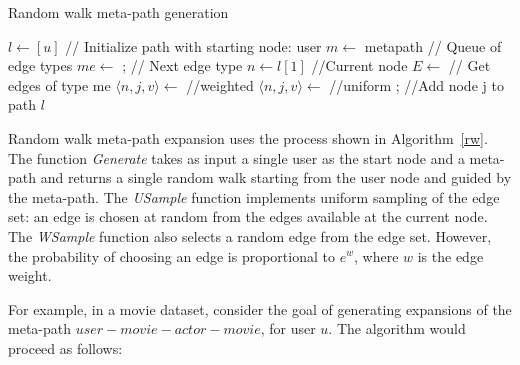\documentclass {acmart}
\begin{document}
	\begin{algorithm}
		\caption{Random walk meta-path generation}\label{rw}
		\begin{algorithmic}
			\Require $l \gets [ u ]$ // Initialize path with starting node: user
			\Require $m \gets$ metapath // Queue of edge types
			\State $me \gets$ ; // Next edge type
			\State $n \gets l[1]$ //Current node
			\State $E \gets$  // Get edges of type me
			\State $\langle n,j,v \rangle \gets$  //weighted
			\Else
			\State $\langle n,j,v \rangle \gets$  //uniform
			\EndIf
			\State {}; //Add node j to path
			\State {}
			\Else
			\State \Return $l$ 
			\EndIf
			
			\EndFunction
			
		\end{algorithmic}
	\end{algorithm}


Random walk meta-path expansion uses the process shown in Algorithm~\ref{rw}. The function \textit{Generate} takes as input a single user as the start node and a meta-path and returns a single random walk starting from the user node and guided by the meta-path. The \textit{USample} function implements uniform sampling of the edge set: an edge is chosen at random from the edges available at the current node. The \textit{WSample} function also selects a random edge from the edge set. However, the probability of choosing an edge is proportional to $e^w$, where $w$ is the edge weight. 

For example, in a movie dataset, consider the goal of generating expansions of the meta-path $user-movie-actor-movie$, for user $u$. The algorithm would proceed as follows:
\end{document}
